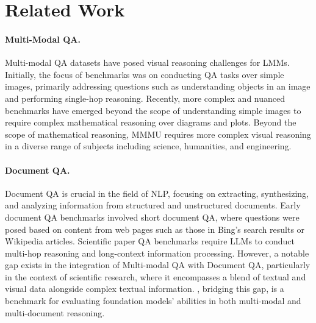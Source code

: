\section{Related Work}

\paragraph{Multi-Modal QA.} 
%
Multi-modal QA datasets have posed visual reasoning challenges for LMMs. 
Initially, the focus of benchmarks \cite{coco, MobasherParsVQACapsAB, yagcioglu-etal-2018-recipeqa, talmor2021multimodalqa, scienceqa, chang2022webqa, li2023seedbench, liu2023mmbench, yu2023mmvet} was on conducting QA tasks over simple images, primarily addressing questions such as understanding objects in an image and performing single-hop reasoning. 
%
Recently, more complex and nuanced benchmarks \cite{chen2022geoqa, lu2024mathvista} have emerged beyond the scope of understanding simple images to require complex mathematical reasoning over diagrams and plots. 
%
Beyond the scope of mathematical reasoning, MMMU \cite{yue2023mmmu} requires more complex visual reasoning in a diverse range of subjects including science, humanities, and engineering. 

\paragraph{Document QA.} 
%
Document QA is crucial in the field of NLP, focusing on extracting, synthesizing, and analyzing information from structured and unstructured documents. 
%
Early document QA benchmarks \cite{rajpurkar2016squad, bajaj2018msmarco, yang2018hotpotqa} involved short document QA, where questions were posed based on content from web pages such as those in Bing's search results or Wikipedia articles. 
%
Scientific paper QA benchmarks \cite{dasigi-etal-2021-dataset, pmlr-v202-lee23n} require LLMs to conduct multi-hop reasoning and long-context information processing. 
%
However, a notable gap exists in the integration of Multi-modal QA with Document QA, particularly in the context of scientific research, where it encompasses a blend of textual and visual data alongside complex textual information. 
%
\data, bridging this gap, is a benchmark for evaluating foundation models' abilities in both multi-modal and multi-document reasoning.

